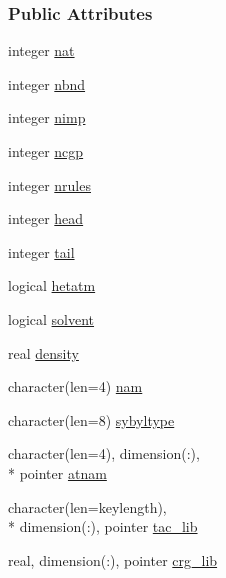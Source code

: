 \subsubsection*{Public Attributes}
\begin{DoxyCompactItemize}
\item 
integer \hyperlink{structprep_1_1lib__entry__type_ac64d03a0a3f24ed137c23e7cfd4ee23e}{nat}
\item 
integer \hyperlink{structprep_1_1lib__entry__type_af60ed05d0b1a8f55b13034182d7aac7f}{nbnd}
\item 
integer \hyperlink{structprep_1_1lib__entry__type_a465c1b3ff8f6a04457a92d6101a87ad2}{nimp}
\item 
integer \hyperlink{structprep_1_1lib__entry__type_a9c9cf07995ef8642422f0913795b5d36}{ncgp}
\item 
integer \hyperlink{structprep_1_1lib__entry__type_a01c62928698a70dc1b6fc2dfb6f455fa}{nrules}
\item 
integer \hyperlink{structprep_1_1lib__entry__type_a9004ff4fe24d46b7e0ccbb20f243cd0d}{head}
\item 
integer \hyperlink{structprep_1_1lib__entry__type_ac24686e331c11448862c335012b45734}{tail}
\item 
logical \hyperlink{structprep_1_1lib__entry__type_a068ffb62d74c9d6050433868c5d2fb44}{hetatm}
\item 
logical \hyperlink{structprep_1_1lib__entry__type_aa396848da6da0139017933ce6903c403}{solvent}
\item 
real \hyperlink{structprep_1_1lib__entry__type_aedd5873eb866bd88b8c173316dd3f7d9}{density}
\item 
character(len=4) \hyperlink{structprep_1_1lib__entry__type_a7f130172df5dca976aa918e5db585836}{nam}
\item 
character(len=8) \hyperlink{structprep_1_1lib__entry__type_a9bc4058cdcea1d6db8d48b8bc1db899c}{sybyltype}
\item 
character(len=4), dimension(\-:), \\*
pointer \hyperlink{structprep_1_1lib__entry__type_a2d174c880961fd024aefdc62d1a1762c}{atnam}
\item 
character(len=keylength), \\*
dimension(\-:), pointer \hyperlink{structprep_1_1lib__entry__type_a22e7ec4e4acf6972efa3afc742bad730}{tac\-\_\-lib}
\item 
real, dimension(\-:), pointer \hyperlink{structprep_1_1lib__entry__type_aff5cea6fcc91e693f42c94fed7035cc8}{crg\-\_\-lib}
\item 

\end{DoxyCompactItemize}

